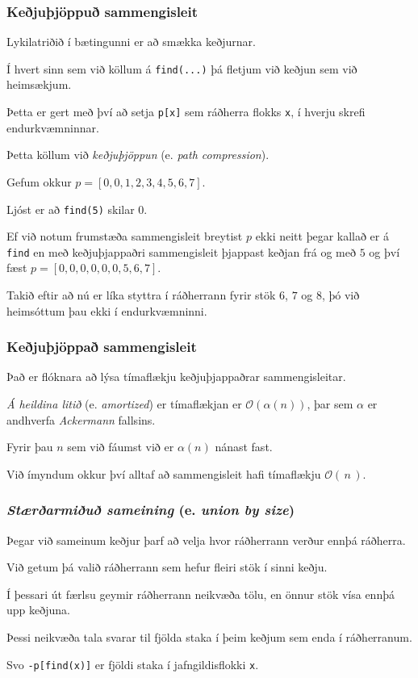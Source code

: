 {
	\frametitle{Keðjuþjöppuð sammengisleit}
	{
		\item<1-> Lykilatriðið í bætingunni er að smækka keðjurnar.
		\item<2-> Í hvert sinn sem við köllum á \texttt{find(...)} þá fletjum við keðjun sem við heimsækjum.
		\item<3-> Þetta er gert með því að setja \texttt{p[x]} sem ráðherra flokks \texttt{x}, í hverju skrefi endurkvæmninnar.
		\item<4-> Þetta köllum við \emph{keðjuþjöppun} (e. \emph{path compression}).
	}
}

{
	{
		\item<1-> Gefum okkur
			$p = [0, 0, 1, 2, 3, 4, 5, 6, 7]$.
		\item<2-> Ljóst er að \texttt{find(5)} skilar $0$.
		\item<3-> Ef við notum frumstæða sammengisleit breytist $p$ ekki neitt þegar kallað er á \texttt{find}
			en með keðjuþjappaðri sammengisleit þjappast keðjan frá og með $5$ og því fæst
			$p = [0, 0, 0, 0, 0, 0, 5, 6, 7]$.
		\item<4-> Takið eftir að nú er líka styttra í ráðherrann fyrir stök $6$, $7$ og $8$, þó við heimsóttum þau ekki í endurkvæmninni.
	}
}

{
	\frametitle{Keðjuþjöppað sammengisleit}
}

{
	{
		\item<1-> Það er flóknara að lýsa tímaflækju keðjuþjappaðrar sammengisleitar.
		\item<2-> \emph{Á heildina litið} (e. \emph{amortized}) er tímaflækjan er $\mathcal{O}(\alpha(n))$,
					þar sem $\alpha$ er andhverfa \emph{Ackermann} fallsins.
		\item<3-> Fyrir þau $n$ sem við fáumst við er $\alpha(n)$ nánast fast.
		\item<4-> Við ímyndum okkur því alltaf að sammengisleit hafi tímaflækju $\mathcal{O}(\,n\,)$.
	}
}

{
	\frametitle{\emph{Stærðarmiðuð sameining} (e. \emph{union by size})}
	{
		\item<1-> Þegar við sameinum keðjur þarf að velja hvor ráðherrann verður ennþá ráðherra.
		\item<2-> Við getum þá valið ráðherrann sem hefur fleiri stök í sinni keðju.
		\item<3->[] 
		\item<4-> Í þessari út færlsu geymir ráðherrann neikvæða tölu, en önnur stök vísa ennþá upp keðjuna.
		\item<5-> Þessi neikvæða tala svarar til fjölda staka í þeim keðjum sem enda í ráðherranum.
		\item<6-> Svo \texttt{-p[find(x)]} er fjöldi staka í jafngildisflokki \texttt{x}.
	}
}

{
}



